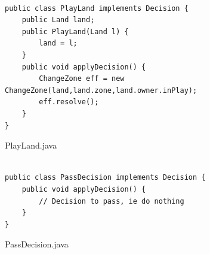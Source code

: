 \begin{figure}[!tbp]
\centering
\lstset{language=Java, stepnumber=1, showspaces=false, showstringspaces=false,breaklines=true}
\begin{lstlisting}

public class PlayLand implements Decision {
	public Land land;
	public PlayLand(Land l) {
		land = l;
	}
	public void applyDecision() {
		ChangeZone eff = new ChangeZone(land,land.zone,land.owner.inPlay);
		eff.resolve();
	}
}
\end{lstlisting}
\caption{PlayLand.java}
\label{}
\end{figure}


\begin{figure}[!tbp]
\centering
\lstset{language=Java, stepnumber=1, showspaces=false, showstringspaces=false,breaklines=true}
\begin{lstlisting}

public class PassDecision implements Decision {
	public void applyDecision() {
		// Decision to pass, ie do nothing
	}
}

\end{lstlisting}
\caption{PassDecision.java}
\label{PassDecision.java}
\end{figure}


